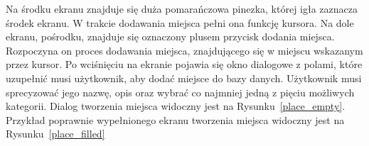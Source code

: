         Na środku ekranu znajduje się duża pomarańczowa pinezka, której igła zaznacza środek ekranu.  W trakcie dodawania miejsca pełni ona funkcję kursora. Na dole ekranu, pośrodku,  znajduje się oznaczony 
        plusem przycisk dodania miejsca. Rozpoczyna on proces dodawania miejsca, znajdującego się w miejscu wskazanym przez kursor. Po wciśnięciu na ekranie pojawia się okno dialogowe z polami, które uzupełnić
        musi użytkownik, aby dodać miejsce do bazy danych. Użytkownik musi sprecyzować jego nazwę, opis oraz wybrać co najmniej jedną z pięciu możliwych kategorii. Dialog tworzenia miejsca widoczny jest na 
        Rysunku~\ref{place_empty}. Przykład poprawnie wypełnionego ekranu tworzenia miejsca widoczny jest na Rysunku~\ref{place_filled}

        \begin{figure}[H]%
            \centering
            \begin{subfigure}[b]{0.3\textwidth}
                \centering

\end{subfigure}
\end{figure}
